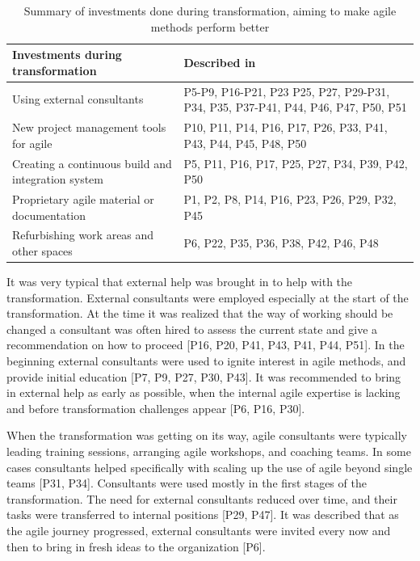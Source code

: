 \begin{table}[h]
    \centering
    \begin{tabular}{ >{\raggedright\arraybackslash}p{}
                     >{\raggedright\arraybackslash}p{} }
        \toprule
        Investments during transformation      &  Described in  \\
        \midrule
        Using external consultants  &
                P5-P9, P16-P21, P23 P25, P27, P29-P31,
                P34, P35, P37-P41, P44, P46, P47, P50, P51  \\  %
        New project management tools for agile  &
                P10, P11, P14, P16, P17, P26, P33,
                P41, P43, P44, P45, P48, P50 \\
        Creating a continuous build and integration system  &
                P5, P11, P16, P17, P25, P27, P34, P39, P42, P50 \\
        Proprietary agile material or documentation   & 
                P1, P2, P8, P14, P16, P23, P26, P29, P32, P45  \\
        Refurbishing work areas and other spaces   &
                P6, P22, P35, P36, P38, P42, P46, P48 \\
        \bottomrule
    \end{tabular}
    \caption{Summary of investments done during transformation, aiming to make
             agile methods perform better}
    \label{table:transformation_investments}
\end{table}



It was very typical that external help was brought in to help with the
transformation.
External consultants were employed especially at the start of the
transformation. At the time it was realized that the way of working should be
changed a consultant was often hired to assess the current state and give a
recommendation on how to proceed [P16, P20, P41, P43, P41, P44, P51].
In the beginning external consultants were used to ignite interest in agile
methods, and provide initial education [P7, P9, P27, P30, P43].
It was recommended to bring in external help as early as possible, when the
internal agile expertise is lacking and before transformation challenges appear
[P6, P16, P30].

When the transformation was getting on its way, agile consultants were typically
leading training sessions, arranging agile workshops, and coaching teams.
In some cases consultants helped specifically with scaling up the use of agile
beyond single teams [P31, P34].
Consultants were used mostly in the first stages of the transformation.
The need for external consultants reduced over time, and their tasks were
transferred to internal positions [P29, P47].
It was described that as the agile journey progressed, external consultants were
invited every now and then to bring in fresh ideas to the organization [P6].

